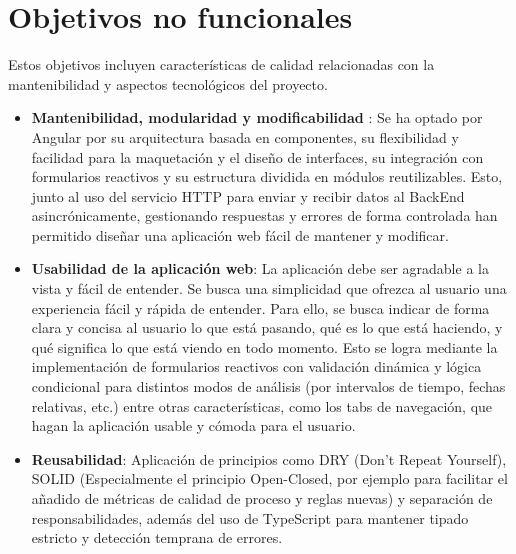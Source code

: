 \section{Objetivos no funcionales}

Estos objetivos incluyen características de calidad relacionadas con la mantenibilidad y aspectos tecnológicos del proyecto.

\begin{itemize}
  \item \textbf{Mantenibilidad, modularidad y modificabilidad }: Se ha optado por Angular por su arquitectura basada en componentes, su flexibilidad y facilidad para la maquetación y el diseño de interfaces, su integración con formularios reactivos y su estructura dividida en módulos reutilizables. Esto, junto al uso del servicio HTTP para enviar y recibir datos al BackEnd asincrónicamente, gestionando respuestas y errores de forma controlada han permitido diseñar una aplicación web fácil de mantener y modificar.
  
  \item \textbf{Usabilidad de la aplicación web}: La aplicación debe ser agradable a la vista y fácil de entender. Se busca una simplicidad que ofrezca al usuario una experiencia fácil y rápida de entender. Para ello, se busca indicar de forma clara y concisa al usuario lo que está pasando, qué es lo que está haciendo, y qué significa lo que está viendo en todo momento. Esto se logra mediante la implementación de formularios reactivos con validación dinámica y lógica condicional para distintos modos de análisis (por intervalos de tiempo, fechas relativas, etc.) entre otras características, como los tabs de navegación, que hagan la aplicación usable y cómoda para el usuario.

  \item \textbf{Reusabilidad}: Aplicación de principios como DRY (Don't Repeat Yourself), SOLID (Especialmente el principio Open-Closed, por ejemplo para facilitar el añadido de métricas de calidad de proceso y reglas nuevas) y separación de responsabilidades, además del uso de TypeScript para mantener tipado estricto y detección temprana de errores.


\end{itemize}
